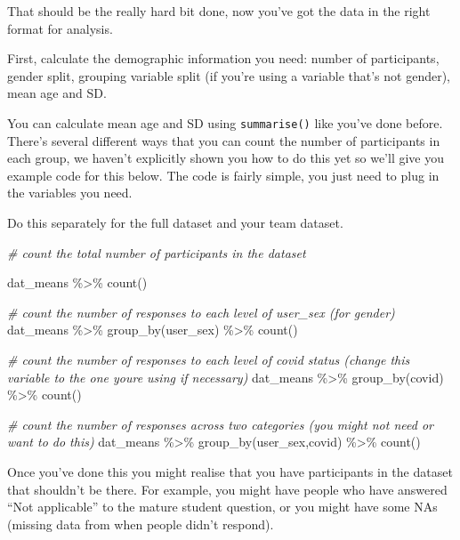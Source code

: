 \documentclass[
  oneside]{book}
\newenvironment{Shaded}{\begin{snugshade}}{\end{snugshade}}
\newcommand{\CommentTok}[1]{\textcolor[rgb]{0.56,0.35,0.01}{\textit{#1}}}
\newcommand{\FunctionTok}[1]{\textcolor[rgb]{0.00,0.00,0.00}{#1}}
\newcommand{\NormalTok}[1]{#1}
\newcommand{\SpecialCharTok}[1]{\textcolor[rgb]{0.00,0.00,0.00}{#1}}
\begin{document}
That should be the really hard bit done, now you've got the data in the right format for analysis.

First, calculate the demographic information you need: number of participants, gender split, grouping variable split (if you're using a variable that's not gender), mean age and SD.

You can calculate mean age and SD using \texttt{summarise()} like you've done before. There's several different ways that you can count the number of participants in each group, we haven't explicitly shown you how to do this yet so we'll give you example code for this below. The code is fairly simple, you just need to plug in the variables you need.

Do this separately for the full dataset and your team dataset.

\begin{Shaded}
\begin{Highlighting}[]
\CommentTok{\# count the total number of participants in the dataset}

\NormalTok{dat\_means }\SpecialCharTok{\%\textgreater{}\%}
  \FunctionTok{count}\NormalTok{()}

\CommentTok{\# count the number of responses to each level of user\_sex (for gender)}
\NormalTok{dat\_means }\SpecialCharTok{\%\textgreater{}\%}
  \FunctionTok{group\_by}\NormalTok{(user\_sex) }\SpecialCharTok{\%\textgreater{}\%}
  \FunctionTok{count}\NormalTok{()}

\CommentTok{\# count the number of responses to each level of covid status (change this variable to the one you\textquotesingle{}re using if necessary)}
\NormalTok{dat\_means }\SpecialCharTok{\%\textgreater{}\%}
  \FunctionTok{group\_by}\NormalTok{(covid) }\SpecialCharTok{\%\textgreater{}\%}
  \FunctionTok{count}\NormalTok{()}

\CommentTok{\# count the number of responses across two categories (you might not need or want to do this)}
\NormalTok{dat\_means }\SpecialCharTok{\%\textgreater{}\%}
  \FunctionTok{group\_by}\NormalTok{(user\_sex,covid) }\SpecialCharTok{\%\textgreater{}\%}
  \FunctionTok{count}\NormalTok{()}
\end{Highlighting}
\end{Shaded}

Once you've done this you might realise that you have participants in the dataset that shouldn't be there. For example, you might have people who have answered ``Not applicable'' to the mature student question, or you might have some NAs (missing data from when people didn't respond).
\end{document}
